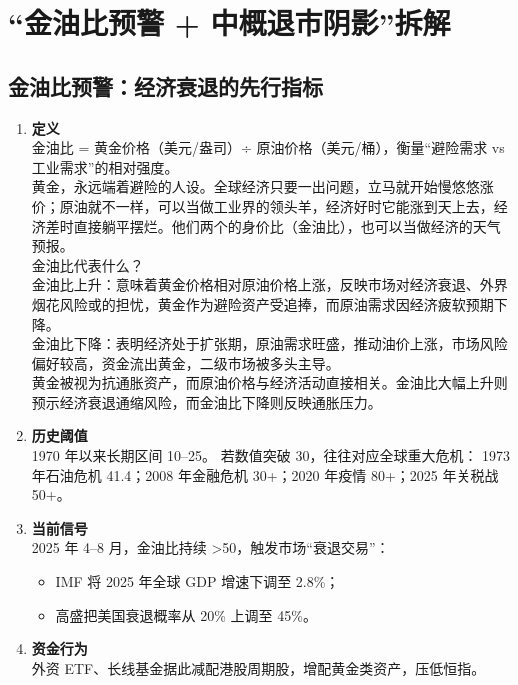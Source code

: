 \section{“金油比预警 + 中概退市阴影”拆解}

\subsection{金油比预警：经济衰退的先行指标}
\begin{enumerate}[leftmargin=*, nosep]
    \item \textbf{定义}  \\
    {\color{red}金油比 = 黄金价格（美元/盎司）÷ 原油价格（美元/桶），衡量“避险需求 vs 工业需求”的相对强度。}\\
    黄金，永远端着避险的人设。全球经济只要一出问题，立马就开始慢悠悠涨价；原油就不一样，可以当做工业界的领头羊，经济好时它能涨到天上去，经济差时直接躺平摆烂。他们两个的身价比（金油比），也可以当做经济的天气预报。\\
    金油比代表什么？\\
    金油比上升：意味着黄金价格相对原油价格上涨，反映市场对经济衰退、外界烟花风险或的担忧，黄金作为避险资产受追捧，而原油需求因经济疲软预期下降。\\
    金油比下降：表明经济处于扩张期，原油需求旺盛，推动油价上涨，市场风险偏好较高，资金流出黄金，二级市场被多头主导。\\
    黄金被视为抗通胀资产，而原油价格与经济活动直接相关。金油比大幅上升则预示经济衰退通缩风险，而金油比下降则反映通胀压力。
    \item \textbf{历史阈值}  \\
    1970 年以来长期区间 10–25。  
    若数值突破 30，往往对应全球重大危机：  
    1973 年石油危机 41.4；2008 年金融危机 30+；2020 年疫情 80+；2025 年关税战 50+。
    \item \textbf{当前信号}  \\
    2025 年 4–8 月，金油比持续 >50，触发市场“衰退交易”：  
    \begin{itemize}[nosep]
        \item IMF 将 2025 年全球 GDP 增速下调至 2.8\%；  
        \item 高盛把美国衰退概率从 20\% 上调至 45\%。
    \end{itemize}
    \item \textbf{资金行为}  \\
    外资 ETF、长线基金据此减配港股周期股，增配黄金类资产，压低恒指。
\end{enumerate}

